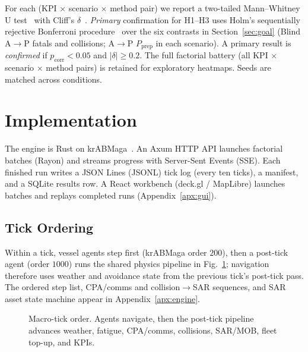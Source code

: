 \documentclass[cameraready]{Interspeech}
\begin{document}
For each (KPI $\times$ scenario $\times$ method pair) we report a two-tailed Mann--Whitney U test~\cite{mannwhitney1947} with Cliff's $\delta$~\cite{cliff1993}. \emph{Primary} confirmation for H1--H3 uses Holm's sequentially rejective Bonferroni procedure~\cite{holm1979} over the six contrasts in Section~\ref{sec:goal} (Blind A$\to$P fatals and collisions; A$\to$P $P_{\text{prep}}$ in each scenario). A primary result is \emph{confirmed} if $p_{\text{corr}} < 0.05$ and $|\delta| \ge 0.2$. The full factorial battery (all KPI $\times$ scenario $\times$ method pairs) is retained for exploratory heatmaps. Seeds are matched across conditions.

\section{Implementation}
\label{sec:implementation}

The engine is Rust on krABMaga~\cite{krabmaga2023}. An Axum HTTP API launches factorial batches (Rayon) and streams progress with Server-Sent Events (SSE). Each finished run writes a JSON Lines (JSONL) tick log (every ten ticks), a manifest, and a SQLite results row. A React workbench (deck.gl / MapLibre) launches batches and replays completed runs (Appendix~\ref{apx:gui}).

\subsection{Tick Ordering}
\label{sec:loop}

Within a tick, vessel agents step first (krABMaga order $200$), then a post-tick agent (order $1000$) runs the shared physics pipeline in Fig.~\ref{fig:tick}; navigation therefore uses weather and avoidance state from the previous tick's post-tick pass. The ordered step list, CPA/comms and collision$\to$SAR sequences, and SAR asset state machine appear in Appendix~\ref{apx:engine}.

\begin{figure}[t]
\centering
{}
\caption{Macro-tick order. Agents navigate, then the post-tick pipeline advances weather, fatigue, CPA/comms, collisions, SAR/MOB, fleet top-up, and KPIs.}
\label{fig:tick}
\end{figure}
\end{document}
